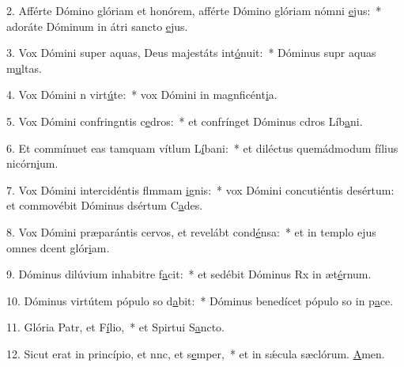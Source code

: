 2. Afférte Dómino glóriam et honórem, afférte Dómino glóriam nómni \uline{e}jus:~* adoráte Dóminum in átri sancto \uline{e}jus.\par 
3. Vox Dómini super aquas, Deus majestáts int\uline{ó}nuit:~* Dóminus supr aquas m\uline{u}ltas.\par 
4. Vox Dómini n virt\uline{ú}te:~* vox Dómini in magnficént\uline{i}a.\par 
5. Vox Dómini confringntis c\uline{e}dros:~* et confrínget Dóminus cdros Líb\uline{a}ni.\par 
6. Et commínuet eas tamquam vítlum L\uline{í}bani:~* et diléctus quemádmodum fílius nicórn\uline{i}um.\par 
7. Vox Dómini intercidéntis flmmam \uline{i}gnis:~* vox Dómini concutiéntis desértum: et commovébit Dóminus dsértum C\uline{a}des.\par 
8. Vox Dómini præparántis cervos, et revelábt cond\uline{é}nsa:~* et in templo ejus omnes dcent glór\uline{i}am.\par 
9. Dóminus dilúvium inhabitre f\uline{a}cit:~* et sedébit Dóminus Rx in æt\uline{é}rnum.\par 
10. Dóminus virtútem pópulo so d\uline{a}bit:~* Dóminus benedícet pópulo so in p\uline{a}ce.\par 
11. Glória Patr, et F\uline{í}lio,~* et Spirtui S\uline{a}ncto.\par 
12. Sicut erat in princípio, et nnc, et s\uline{e}mper,~* et in sǽcula sæclórum. \uline{A}men.\par 
